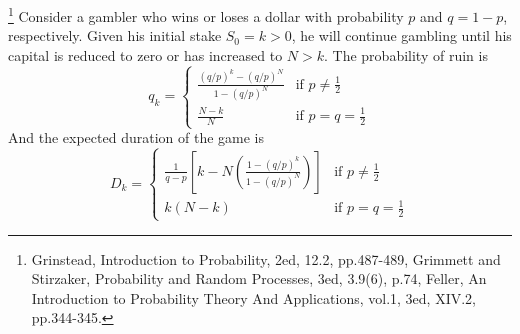 \begin{lemma}
\footnote{Grinstead, Introduction to Probability, 2ed, 12.2, pp.487-489,
  Grimmett and Stirzaker, Probability and Random Processes, 3ed, 3.9(6), p.74,
  Feller, An Introduction to Probability Theory And Applications, vol.1, 3ed, 
  XIV.2, pp.344-345.}
Consider a gambler who wins or loses a dollar with probability $p$ and $q=1-p$,
respectively. Given his initial stake $S_0=k>0$, he will continue gambling 
until his capital is reduced to zero or has increased to $N>k$. The probability
of ruin is
\begin{equation}
  q_k= 
    \begin{cases}
      \frac{(q/p)^k - (q/p)^N}{1 - (q/p)^N}  &\text{if $p\neq \frac{1}{2}$} \\
      \frac{N-k}{N}                          &\text{if $p=q= \frac{1}{2}$} 
    \end{cases}
\end{equation}
And the expected duration of the game is
\begin{equation}
  D_k= 
    \begin{cases}
      \frac{1}{q-p} 
        \left[ k - N \left( \frac{1-(q/p)^k}{1-(q/p)^N} \right) \right]
                &\text{if $p\neq \frac{1}{2}$} \\
      k (N-k)   &\text{if $p=q= \frac{1}{2}$} 
    \end{cases}
\end{equation}
\end{lemma}
